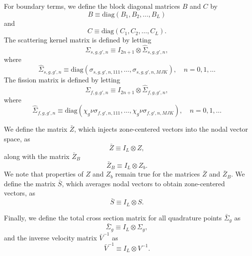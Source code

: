 For boundary terms, we define the block diagonal matrices $B$ and $C$ by
\begin{equation}
	B \equiv \text{diag}(B_{1}, B_{2}, \dots, B_{L})
\end{equation}
and
\begin{equation}
	C \equiv \text{diag}(C_{1}, C_{2}, \dots, C_{L}).
\end{equation}
The scattering kernel matrix is defined by letting
\begin{equation}
	\Sigma_{s,g,g',n} \equiv I_{2n+1} \otimes \hat{\Sigma}_{s,g,g',n},
\end{equation}
where
\begin{equation}
	\hat{\Sigma}_{s,g,g',n} \equiv \text{diag}(\sigma_{s,g,g',n,111}, \dots, \sigma_{s,g,g',n,MJK}), \quad n = 0,1, \dots
\end{equation}
The fission matrix is defined by letting
\begin{equation}
	\Sigma_{f,g,g',n} \equiv I_{2n+1} \otimes \hat{\Sigma}_{f,g,g',n},
\end{equation}
where
\begin{equation}
	\hat{\Sigma}_{f,g,g',n} \equiv \text{diag}(\chi_{g} \nu \sigma_{f,g',n,111}, \dots, \chi_{g} \nu \sigma_{f,g',n,MJK}), \quad n = 0,1, \dots
\end{equation}

We define the matrix $\bar{Z}$, which injects zone-centered vectors into the nodal vector space, as
\begin{equation}
	\bar{Z} \equiv I_{L} \otimes Z,
\end{equation}
 along with the matrix $\bar{Z}_{B}$
\begin{equation}
	\bar{Z}_{B} \equiv I_{L} \otimes Z_{b}.
\end{equation}
We note that properties of $Z$ and $Z_{b}$ remain true for the matrices $\bar{Z}$ and $\bar{Z}_{B}$. We define the matrix $\bar{S}$, which averages nodal vectors to obtain zone-centered vectors, as
\begin{equation}
	\bar{S} \equiv I_{L} \otimes S.
\end{equation}

Finally, we define the total cross section matrix for all quadrature points $\bar{\Sigma}_{g}$ as
\begin{equation}
	\bar{\Sigma}_{g} \equiv I_{L} \otimes \Sigma_{g},
\end{equation}
and the inverse velocity matrix $\bar{V}^{-1}$ as
\begin{equation}
	\bar{V}^{-1} \equiv I_{L} \otimes V^{-1}.
\end{equation}

